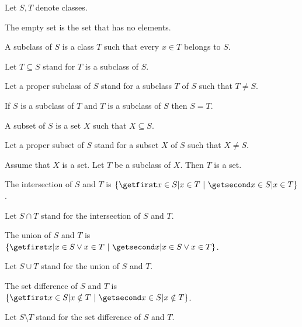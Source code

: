 \documentclass[english,11pt]{article}
\begin{document}
\begin{forthel}
  Let $S, T$ denote classes.

  \begin{definition}
    The empty set is the set that has no elements.
  \end{definition}

  \begin{definition}
    A subclass of $S$ is a class $T$ such that every $x \in T$ belongs to $S$.
  \end{definition}

  Let $T \subseteq S$ stand for $T$ is a subclass of $S$.

  Let a proper subclass of $S$ stand for a subclass $T$ of $S$ such that $T \neq
  S$.

  \begin{lemma}[title=Class Extensionality]
    If $S$ is a subclass of $T$ and $T$ is a subclass of $S$ then $S = T$.
  \end{lemma}

  \begin{definition}
    A subset of $S$ is a set $X$ such that $X \subseteq S$.
  \end{definition}

  Let a proper subset of $S$ stand for a subset $X$ of $S$ such that $X \neq S$.

  \begin{axiom}[title=Separation Axiom]
    Assume that $X$ is a set.
    Let $T$ be a subclass of $X$.
    Then $T$ is a set.
  \end{axiom}

  \begin{definition}
    The intersection of $S$ and $T$ is $\class{x \in S | x \in T}$.
  \end{definition}

  Let $S \cap T$ stand for the intersection of $S$ and $T$.

  \begin{definition}
    The union of $S$ and $T$ is $\class{x | x \in S \vee x \in T}$.
  \end{definition}

  Let $S \cup T$ stand for the union of $S$ and $T$.

  \begin{definition}
    The set difference of $S$ and $T$ is $\class{x \in S | x \notin T}$.
  \end{definition}

  Let $S \setminus T$ stand for the set difference of $S$ and $T$.


\end{forthel}
\end{document}
